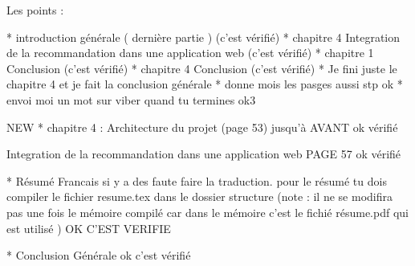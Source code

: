 Les points :

* introduction générale ( dernière partie ) (c'est vérifié)
* chapitre 4 Integration de la recommandation dans une application web (c'est vérifié)
* chapitre 1 Conclusion (c'est vérifié)
* chapitre 4 Conclusion (c'est vérifié)
* Je fini juste le chapitre 4 et je fait la conclusion générale
* donne mois les pasges aussi stp ok
* envoi moi un mot sur viber quand tu termines ok3



NEW
* chapitre 4 : Architecture du projet (page 53) jusqu'à AVANT ok vérifié

Integration de la recommandation dans une application web  PAGE 57 ok vérifié

* Résumé Francais si y a des faute faire la traduction.
    pour le résumé tu dois compiler le fichier resume.tex dans le dossier structure (note : il ne se modifira pas une fois le mémoire compilé car dans le mémoire c'est le fichié résume.pdf qui est utilisé )  OK C'EST VERIFIE

* Conclusion Générale ok c'est vérifié

